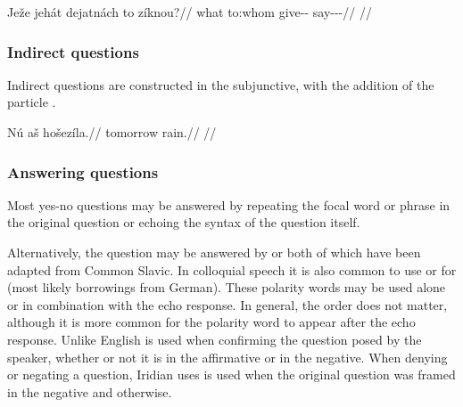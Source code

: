 \pex
\begingl
\gla Ježe jehát dejatnách to zíknou?//
\glb what to:whom give-\Pv{}-\Ctp{} \Rz{} say-\Pv{}-\Pf{}-\Nz{}//
\glft {}//
\endgl
\xe


\subsubsection{Indirect questions}

Indirect questions are constructed in the subjunctive, with the addition of the particle .

\pex
\begingl
\gla Nú aš hošezíla.//
\glb tomorrow  rain.//
\glft {}//
\endgl
\xe

\subsubsection{Answering questions}\label{sec:ansyn}

Most yes-no questions may be answered by repeating the focal word or phrase in the original question or echoing the syntax of the question itself.

\ex
{}
\xe

Alternatively, the question may be answered by  or  both of which have been adapted from Common Slavic. In colloquial speech it is also common to use  or  for  (most likely borrowings from German). These polarity words may be used alone or in combination with the echo response. In general, the order does not matter, although it is more common for the polarity word to appear after the echo response. Unlike English   is used when confirming the question posed by the speaker, whether or not it is in the affirmative or in the negative. When denying or negating a question, Iridian uses  is used when the original question was framed in the negative and  otherwise.

\ex
{}\xe


